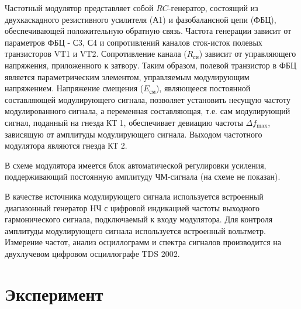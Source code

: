 Частотный модулятор представляет собой $RC$-генератор, состоящий из двухкаскадного резистивного усилителя (А1) и фазобалансной цепи (ФБЦ), обеспечивающей положительную обратную связь. Частота генерации зависит от параметров ФБЦ - С3, С4 и сопротивлений каналов сток-исток полевых транзисторов VT1 и VT2. Сопротивление канала ($R_\text{си}$) зависит от управляющего напряжения, приложенного к затвору. Таким образом, полевой транзистор в ФБЦ является параметрическим элементом, управляемым модулирующим напряжением. Напряжение смещения ($E_\text{см}$), являющееся постоянной составляющей модулирующего сигнала, позволяет установить несущую частоту модулированного сигнала, а переменная составляющая, т.е. сам модулирующий сигнал, поданный на гнезда КТ 1, обеспечивает девиацию частоты $\Delta f_\text{max}$, зависящую от амплитуды модулирующего сигнала. Выходом частотного модулятора являются гнезда КТ 2.

В схеме модулятора имеется блок автоматической регулировки усиления, поддерживающий постоянную амплитуду ЧМ-сигнала (на схеме не показан).

В качестве источника модулирующего сигнала используется встроенный диапазонный генератор НЧ с цифровой индикацией частоты выходного гармонического сигнала, подключаемый к входу модулятора. Для контроля амплитуды модулирующего сигнала используется встроенный вольтметр. Измерение частот, анализ осциллограмм и спектра сигналов производится на двухлучевом цифровом осциллографе TDS 2002.

\section{Эксперимент}
